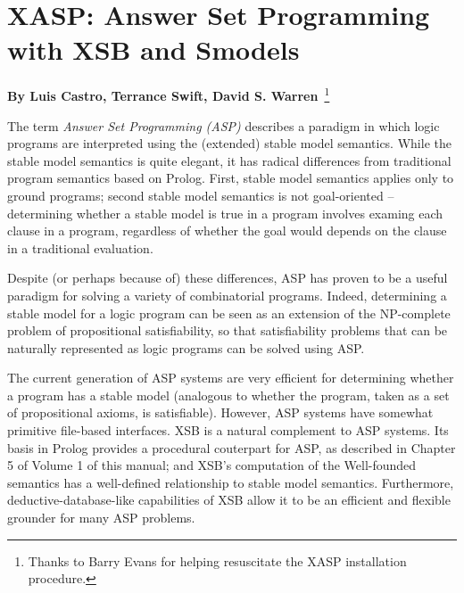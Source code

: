 \chapter{XASP: Answer Set Programming with XSB and Smodels}
\label{xasp}

\begin{center}
{\Large {\bf By Luis Castro, Terrance Swift, David
    S. Warren}~\footnote{ Thanks to Barry Evans for helping
    resuscitate the XASP installation procedure.}}
\end{center}

The term {\em Answer Set Programming (ASP)} describes a paradigm in
which logic programs are interpreted using the (extended) stable model
semantics.  While the stable model semantics is quite elegant, it has
radical differences from traditional program semantics based on
Prolog.  First, stable model semantics applies only to ground
programs; second stable model semantics is not goal-oriented --
determining whether a stable model is true in a program involves
examing each clause in a program, regardless of whether the goal would
depends on the clause in a traditional evaluation.

Despite (or perhaps because of) these differences, ASP has proven to
be a useful paradigm for solving a variety of combinatorial programs.
Indeed, determining a stable model for a logic program can be seen as
an extension of the NP-complete problem of propositional
satisfiability, so that satisfiability problems that can be naturally
represented as logic programs can be solved using ASP.  

The current generation of ASP systems are very efficient for
determining whether a program has a stable model (analogous to whether
the program, taken as a set of propositional axioms, is satisfiable).
However, ASP systems have somewhat primitive file-based interfaces.
XSB is a natural complement to ASP systems.  Its basis in Prolog
provides a procedural couterpart for ASP, as described in Chapter 5 of
Volume 1 of this manual; and XSB's computation of the Well-founded
semantics has a well-defined relationship to stable model semantics.
Furthermore, deductive-database-like capabilities of XSB allow it to
be an efficient and flexible grounder for many ASP problems.

